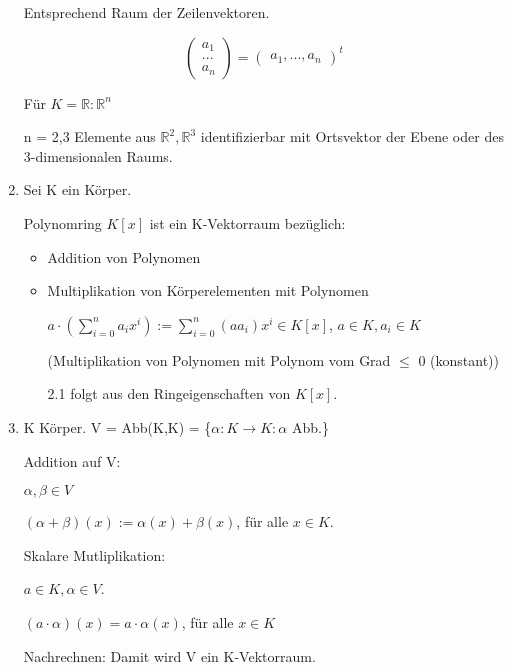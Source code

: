 \documentclass[a4paper, openany]{book}
\begin{document}
\begin{enumerate}[label=(\alph*)]
      Entsprechend Raum der Zeilenvektoren.

      \begin{equation}
        \begin{pmatrix}a_1 \\ ... \\ a_n \end{pmatrix}  = \begin{pmatrix}a_1,...,a_n\end{pmatrix}^t
      \end{equation}

      Für $K =  \mathbb{R} : \mathbb{R}^n$

      n = 2,3 Elemente aus $\mathbb{R}^2, \mathbb{R}^3$ identifizierbar mit Ortsvektor der Ebene oder des 3-dimensionalen Raums.

      \item Sei K ein Körper.

      Polynomring $K[x]$ ist ein K-Vektorraum bezüglich:

      \begin{itemize}
        \item Addition von Polynomen
        \item Multiplikation von Körperelementen mit Polynomen

        \begin{center}
          $a \cdot (\sum_{i=0}^{n} a_ix^i) := \sum_{i=0}^{n} (aa_i)x^i \in K[x]$, $a \in K, a_i \in K$
        \end{center}

        (Multiplikation von Polynomen mit Polynom vom Grad $\le$ 0 (konstant))

        2.1 folgt aus den Ringeigenschaften von $K[x]$.
      \end{itemize}

      \item K Körper. V = Abb(K,K) = \{$\alpha : K \rightarrow K : \alpha$ Abb.\}

      Addition auf V: 

      $\alpha, \beta \in V$

      $(\alpha + \beta)(x) := \alpha(x) + \beta(x)$, für alle $x \in K$.

      Skalare Mutliplikation:

      $a \in K, \alpha \in V$.

      $(a \cdot \alpha)(x) = a \cdot \alpha(x)$, für alle $x \in K$

      Nachrechnen: Damit wird V ein K-Vektorraum.
    \end{enumerate}
\end{document}
